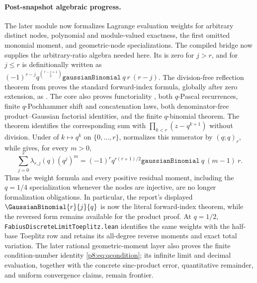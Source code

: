 \documentclass[11pt]{article}
\numberwithin{equation}{section}
\theoremstyle{definition}
\theoremstyle{remark}
\begin{document}
\paragraph{Post-snapshot algebraic progress.}
The later module  now formalizes Lagrange
evaluation weights for arbitrary distinct nodes, polynomial and module-valued
exactness, the first omitted monomial moment, and geometric-node
specializations.  The compiled bridge
 now supplies the arbitrary-ratio
algebra needed here.  Its  is
zero for \(j>r\), and for \(j\le r\) is definitionally written as
\( (-1)^{r-j}q^{\binom{r-j+1}{2}}
\texttt{gaussianBinomial}\ q\ r\ (r-j)\).  The division-free reflection
theorem  from
 proves the standard forward-index formula,
globally after zero extension, as
.  The core also proves
functoriality , both \(q\)-Pascal recurrences,
finite \(q\)-Pochhammer shift and concatenation laws, both denominator-free
product--Gaussian factorial identities, and the finite \(q\)-binomial
theorem.  The theorem
 identifies the corresponding
sum with \(\prod_{k<r}(z-q^{k+1})\) without division.  Under
 of \(k\mapsto q^k\) on \(\{0,\ldots,r\}\),
 normalizes this
numerator by \((q;q)_r\), while
 gives,
for every \(m>0\),
\[
 \sum_{j=0}^{r}\lambda_{r,j}(q)(q^j)^m
 =(-1)^r q^{r(r+1)/2}
   \texttt{gaussianBinomial}\ q\ (m-1)\ r.
\]
Thus the weight formula and every positive residual moment, including the
\(q=1/4\) specialization whenever the nodes are injective, are no longer
formalization obligations.  In particular, the report's displayed
\(\GaussianBinomial{r}{j}{q}\) is now the literal forward-index theorem, while the
reversed form remains available for the product proof.  At \(q=1/2\),
\texttt{FabiusDiscreteLimitToeplitz.lean} identifies the same weights with
the half-base Toeplitz row and retains its all-degree reverse moments and
exact total variation.  The later rational geometric-moment layer also proves
the finite condition-number identity \cref{p8:eq:qcondition}; its infinite limit
and decimal evaluation, together with the concrete sinc-product error,
quantitative remainder, and uniform convergence claims, remain frontier.
\end{document}
